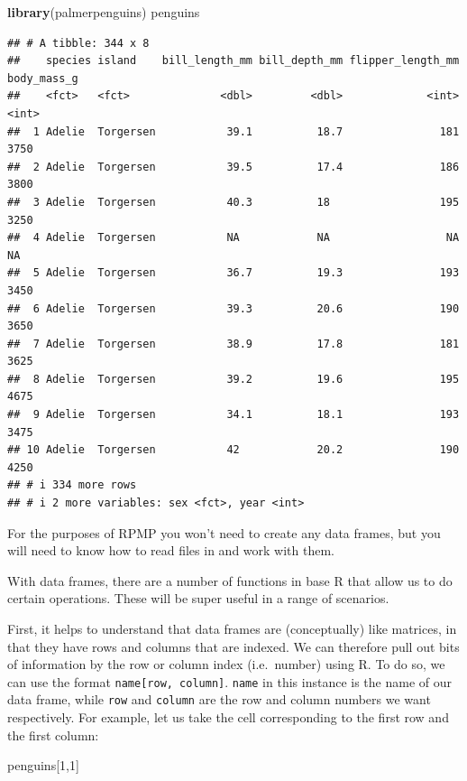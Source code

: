 \documentclass[
]{book}
\newenvironment{Shaded}{\begin{snugshade}}{\end{snugshade}}
\newcommand{\DecValTok}[1]{\textcolor[rgb]{0.00,0.00,0.81}{#1}}
\newcommand{\FunctionTok}[1]{\textcolor[rgb]{0.13,0.29,0.53}{\textbf{#1}}}
\newcommand{\NormalTok}[1]{#1}
\begin{document}
\begin{Shaded}
\begin{Highlighting}[]
\FunctionTok{library}\NormalTok{(palmerpenguins)}
\NormalTok{penguins}
\end{Highlighting}
\end{Shaded}

\begin{verbatim}
## # A tibble: 344 x 8
##    species island    bill_length_mm bill_depth_mm flipper_length_mm body_mass_g
##    <fct>   <fct>              <dbl>         <dbl>             <int>       <int>
##  1 Adelie  Torgersen           39.1          18.7               181        3750
##  2 Adelie  Torgersen           39.5          17.4               186        3800
##  3 Adelie  Torgersen           40.3          18                 195        3250
##  4 Adelie  Torgersen           NA            NA                  NA          NA
##  5 Adelie  Torgersen           36.7          19.3               193        3450
##  6 Adelie  Torgersen           39.3          20.6               190        3650
##  7 Adelie  Torgersen           38.9          17.8               181        3625
##  8 Adelie  Torgersen           39.2          19.6               195        4675
##  9 Adelie  Torgersen           34.1          18.1               193        3475
## 10 Adelie  Torgersen           42            20.2               190        4250
## # i 334 more rows
## # i 2 more variables: sex <fct>, year <int>
\end{verbatim}

For the purposes of RPMP you won't need to create any data frames, but you will need to know how to read files in and work with them.

With data frames, there are a number of functions in base R that allow us to do certain operations. These will be super useful in a range of scenarios.

First, it helps to understand that data frames are (conceptually) like matrices, in that they have rows and columns that are indexed. We can therefore pull out bits of information by the row or column index (i.e.~number) using R. To do so, we can use the format \texttt{name{[}row,\ column{]}}. \texttt{name} in this instance is the name of our data frame, while \texttt{row} and \texttt{column} are the row and column numbers we want respectively. For example, let us take the cell corresponding to the first row and the first column:

\begin{Shaded}
\begin{Highlighting}[]
\NormalTok{penguins[}\DecValTok{1}\NormalTok{,}\DecValTok{1}\NormalTok{]}
\end{Highlighting}
\end{Shaded}
\end{document}
